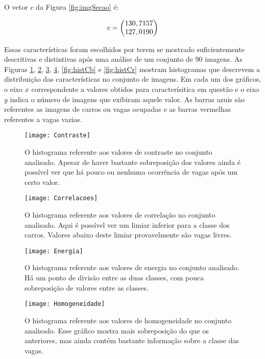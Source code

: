 O vetor $c$ da Figura \ref{fig:imgSecao} é:

\begin{equation}
\centering
\centering
	c = \begin{pmatrix}
	130,7157\\127,0190
	\end{pmatrix}
\centering
\centering
\label{eq:exemploCrominancia}
\end{equation}


Essas características foram escolhidos por terem se mostrado suficientemente descritivas e distintivas após uma análise de um conjunto de 90 imagens. As Figuras \ref{fig:histContraste}, \ref{fig:histCorrelacao},  \ref{fig:histEnergia}, \ref{fig:histHomo},  \ref{fig:histCb} e \ref{fig:histCr} mostram histogramas que descrevem a distribuição das características no conjunto de imagens. Em cada um dos gráficos, o eixo $x$ correspondente a valores obtidos para caracterísitica em questão e o eixo $y$ indica o número de imagens que exibiram aquele valor. As barras azuis são referentes as imagens de carros ou vagas ocupadas e as barras vermelhas referentes a vagas vazias.

\begin{figure}
	\centering
	\texttt{[image: Contraste]}
	\caption{O histograma referente aos valores de contraste no conjunto analisado. Apesar de haver bastante sobreposição dos valores ainda é possível ver que há pouco ou nenhuma ocorrência de vagas após um certo valor.}
		\label{fig:histContraste}
	\centering
\end{figure}

\begin{figure}
	\centering
	\texttt{[image: Correlacoes]}
	\caption{O histograma referente aos valores de correlação no conjunto analisado. Aqui é possível ver um limiar inferior para a classe dos carros. Valores abaixo deste limiar provavelmente são vagas livres.}
		\label{fig:histCorrelacao}
	\centering
\end{figure}

\begin{figure}
	\centering
	\texttt{[image: Energia]}
	\caption{O histograma referente aos valores de energia no conjunto analisado. Há um ponto de divisão entre as duas classes, com pouca sobreposição de valores entre as classes.}
		\label{fig:histEnergia}
	\centering
\end{figure}

\begin{figure}
	\centering
	\texttt{[image: Homogeneidade]}
	\caption{O histograma referente aos valores de homogeneidade no conjunto analisado. Esse gráfico mostra mais sobreposição do que os anteriores, mas ainda contém bastante informação sobre a classe das vagas. }
	\label{fig:histHomo}
	\centering
\end{figure}

